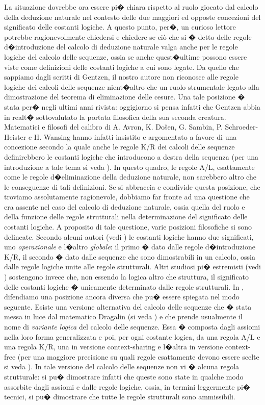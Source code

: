 \documentclass[a4paper,12pt]{aphex}
\begin{document}
La situazione dovrebbe ora essere pi� chiara rispetto al ruolo giocato dal calcolo della deduzione naturale nel contesto delle due maggiori ed opposte concezioni del significato delle costanti logiche. A questo punto, per�,  un curioso lettore potrebbe ragionevolmente chiedersi e chiedere se ci\`o che  si � detto delle regole d�introduzione del calcolo di deduzione naturale valga anche per le regole logiche del calcolo delle sequenze, ossia se anche quest�ultime possono essere viste come definizioni delle costanti logiche a cui sono legate.  Da quello che sappiamo dagli scritti di Gentzen, il nostro autore non riconosce alle regole logiche dei calcoli delle sequenze nient�altro che un ruolo strumentale legato alla dimostrazione del teorema di eliminazione delle cesure. Una tale posizione � stata per� negli ultimi anni rivista:  oggigiorno si pensa infatti che Gentzen abbia in realt� sottovalutato la portata filosofica della sua seconda creatura. Matematici e filosofi del calibro di A. Avron, K. Do\v{s}en, G. Sambin, P. Schroeder-Heister e H. Wansing hanno infatti insistito e argomentato a favore di una concezione secondo la quale anche le regole K/R dei calcoli delle sequenze definirebbero le costanti logiche che introducono a destra della sequenza (per una introduzione a tale tema si veda \cite{poggiolesi}). In questo quadro, le regole A/L, esattamente come le regole d�eliminazione della deduzione naturale, non sarebbero altro che le conseguenze di tali definizioni. Se si abbraccia e condivide questa posizione, che troviamo assolutamente ragionevole, dobbiamo far fronte ad una questione che era assente nel caso del calcolo di deduzione naturale, ossia quella del ruolo e della funzione delle regole strutturali nella determinazione del significato delle costanti logiche.  A proposito di tale questione, varie posizioni filosofiche si sono delineate. Secondo alcuni autori (vedi \cite{wansing}) le costanti logiche hanno due significati, uno \emph{operazionale} e l�altro \emph{globale}: il primo � dato dalle regole d�introduzione K/R, il secondo � dato dalle sequenze che sono dimostrabili in un calcolo, ossia dalle regole logiche unite alle regole strutturali. Altri studiosi pi� estremisti (vedi \cite{dosen}) sostengono invece che,  non essendo la logica altro che struttura, il significato delle costanti logiche � unicamente determinato dalle regole strutturali.  In \cite{poggiolesi}, difendiamo una posizione ancora diversa che pu� essere spiegata nel modo seguente. Esiste una versione alternativa del calcolo delle sequenze che � stata messa in luce dal matematico Dragalin (si veda \cite{dragalin}) e che prende usualmente il nome di \emph{variante logica} del calcolo delle sequenze. Essa � composta dagli assiomi nella loro forma generalizzata e poi, per ogni costante logica, da una regola A/L e una regola K/R, una in versione context-sharing e l�altra in versione context-free (per una maggiore precisione su quali regole esattamente devono essere scelte si veda \cite{prooftheory}). In tale versione del calcolo delle sequenze non vi � alcuna regola strutturale: si pu� dimostrare infatti che queste sono state in qualche modo assorbite dagli assiomi e dalle regole logiche, ossia, in termini leggermente pi� tecnici, si  pu� dimostrare che tutte le regole strutturali sono ammissibili. 
\end{document}

